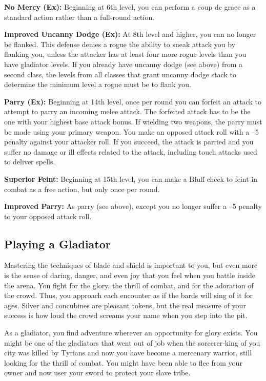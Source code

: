 \textbf{No Mercy (Ex):} Beginning at 6th level, you can perform a coup de grace as a standard action rather than a full‐round action.

\textbf{Improved Uncanny Dodge (Ex):} At 8th level and higher, you can no longer be flanked. This defense denies a rogue the ability to sneak attack you by flanking you, unless the attacker has at least four more rogue levels than you have gladiator levels. If you already have uncanny dodge (see above) from a second class, the levels from all classes that grant uncanny dodge stack to determine the minimum level a rogue must be to flank you.

\textbf{Parry (Ex):} Beginning at 14th level, once per round you can forfeit an attack to attempt to parry an incoming melee attack. The forfeited attack has to be the one with your highest base attack bonus. If wielding two weapons, the parry must be made using your primary weapon. You make an opposed attack roll with a –5 penalty against your attacker roll. If you succeed, the attack is parried and you suffer no damage or ill effects related to the attack, including touch attacks used to deliver spells.

\textbf{Superior Feint:} Beginning at 15th level, you can make a Bluff check to feint in combat as a free action, but only once per round.

\textbf{Improved Parry:} As parry (see above), except you no longer suffer a –5 penalty to your opposed attack roll.

\subsection{Playing a Gladiator}

Mastering the techniques of blade and shield is important to you, but even more is the sense of daring, danger, and even joy that you feel when you battle inside the arena. You fight for the glory, the thrill of combat, and for the adoration of the crowd. Thus, you approach each encounter as if the bards will sing of it for ages. Silver and concubines are pleasant tokens, but the real measure of your success is how loud the crowd screams your name when you step into the pit.

As a gladiator, you find adventure wherever an opportunity for glory exists. You might be one of the gladiators that went out of job when the sorcerer‐king of you city was killed by Tyrians and now you have become a mercenary warrior, still looking for the thrill of combat. You might have been able to flee from your owner and now user your sword to protect your slave tribe.

